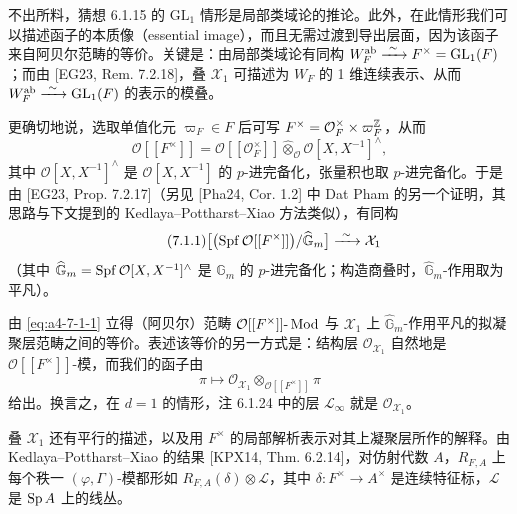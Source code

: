 不出所料，猜想 6.1.15 的 $\mathrm{GL}_1$ 情形是局部类域论的推论。此外，在此情形我们可以描述函子的本质像（essential image），而且无需过渡到导出层面，因为该函子来自阿贝尔范畴的等价。关键是：由局部类域论有同构 $W_F^{\mathrm{ab}}\xrightarrow{\ \sim\ } F^\times=\mathrm{GL}_1(F)$；而由 [EG23, Rem. 7.2.18]，叠 $\mathcal X_1$ 可描述为 $W_F$ 的 1 维连续表示、从而 $W_F^{\mathrm{ab}}\xrightarrow{\ \sim\ }\mathrm{GL}_1(F)$ 的表示的模叠。

更确切地说，选取单值化元 $\varpi_F\in F$ 后可写 $F^\times=\mathcal O_F^\times\times\varpi_F^{\mathbb{Z}}$，从而
\[
\mathcal O[[F^\times]]=\mathcal O[[\mathcal O_F^\times]]\widehat\otimes_{\mathcal O}\mathcal O[X,X^{-1}]^{\wedge},
\]
其中 $\mathcal O[X,X^{-1}]^{\wedge}$ 是 $\mathcal O[X,X^{-1}]$ 的 $p$-进完备化，张量积也取 $p$-进完备化。于是由 [EG23, Prop. 7.2.17]（另见 [Pha24, Cor. 1.2] 中 Dat Pham 的另一个证明，其思路与下文提到的 Kedlaya--Pottharst--Xiao 方法类似），有同构
\begin{equation}\tag{7.1.1}\label{eq:a4-7-1-1}
\bigl[\bigl(\operatorname{Spf}\mathcal O[[F^\times]]\bigr)/\widehat{\mathbb G}_m\bigr]\xrightarrow{\ \sim\ }\mathcal X_1
\end{equation}
（其中 $\widehat{\mathbb G}_m=\operatorname{Spf}\mathcal O[X,X^{-1}]^{\wedge}$ 是 $\mathbb G_m$ 的 $p$-进完备化；构造商叠时，$\widehat{\mathbb G}_m$-作用取为平凡）。

由 \eqref{eq:a4-7-1-1} 立得（阿贝尔）范畴 $\mathcal O[[F^\times]]\text{-}\operatorname{Mod}$ 与 $\mathcal X_1$ 上 $\widehat{\mathbb G}_m$-作用平凡的拟凝聚层范畴之间的等价。表述该等价的另一方式是：结构层 $\mathcal O_{\mathcal X_1}$ 自然地是 $\mathcal O[[F^\times]]$-模，而我们的函子由
\begin{equation}\tag{7.1.2}\label{eq:a4-7-1-2}
\pi\mapsto\mathcal O_{\mathcal X_1}\otimes_{\mathcal O[[F^\times]]}\pi
\end{equation}
给出。换言之，在 $d=1$ 的情形，注 6.1.24 中的层 $\mathcal L_\infty$ 就是 $\mathcal O_{\mathcal X_1}$。

叠 $\mathcal X_1$ 还有平行的描述，以及用 $F^\times$ 的局部解析表示对其上凝聚层所作的解释。由 Kedlaya--Pottharst--Xiao 的结果 [KPX14, Thm. 6.2.14]，对仿射代数 $A$，$R_{F,A}$ 上每个秩一 $(\varphi,\Gamma)$-模都形如 $R_{F,A}(\delta)\otimes\mathcal L$，其中 $\delta:F^\times\to A^\times$ 是连续特征标，$\mathcal L$ 是 $\operatorname{Sp} A$ 上的线丛。

